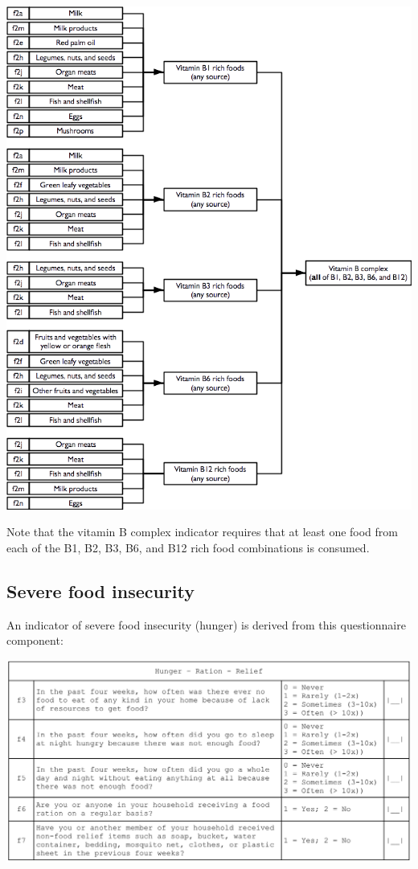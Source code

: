 \documentclass[12pt,a4paper]{book}
\theoremstyle{definition}
\theoremstyle{definition}
\theoremstyle{definition}
\theoremstyle{remark}
\begin{document}
\begin{center}\includegraphics{figures/indicators14} \end{center}

Note that the vitamin B complex indicator requires that at least one
food from each of the B1, B2, B3, B6, and B12 rich food combinations is
consumed.

\hypertarget{severe-food-insecurity}{%
\subsection{Severe food insecurity}\label{severe-food-insecurity}}

An indicator of severe food insecurity (hunger) is derived from this
questionnaire component:

\begin{center}\includegraphics{figures/questionnaire03} \end{center}
\end{document}
